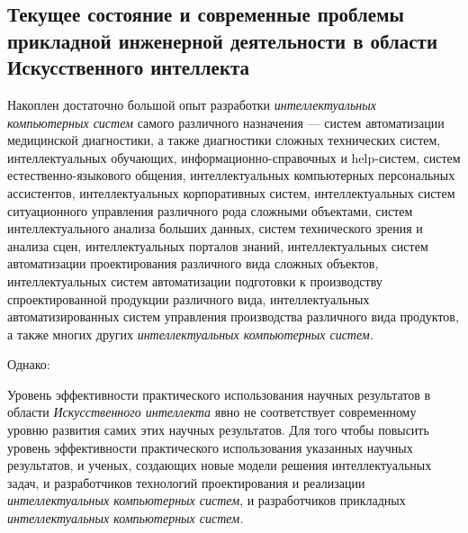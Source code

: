 \subsection{Текущее состояние и современные проблемы прикладной инженерной деятельности в области Искусственного интеллекта}
\label{subsec_current_state_and_modern_problems_applied_engineering_activity}

Накоплен достаточно большой опыт разработки \textit{интеллектуальных компьютерных систем} самого различного назначения --- систем автоматизации медицинской диагностики, а также диагностики сложных технических систем, интеллектуальных обучающих, информационно-справочных и help-систем, систем естественно-языкового общения, интеллектуальных компьютерных персональных ассистентов, интеллектуальных корпоративных систем, интеллектуальных систем ситуационного управления различного рода сложными объектами, систем интеллектуального анализа больших данных, систем технического зрения и анализа сцен, интеллектуальных порталов знаний, интеллектуальных систем автоматизации проектирования различного вида сложных объектов, интеллектуальных систем автоматизации подготовки к производству спроектированной продукции различного вида, интеллектуальных автоматизированных систем управления производства различного вида продуктов, а также многих других \textit{интеллектуальных компьютерных систем.}

Однако:

\begin{textitemize}
	\item
	Уровень эффективности практического использования научных результатов в области \textit{Искусственного интеллекта} явно не соответствует современному уровню развития самих этих научных результатов. Для того чтобы повысить уровень эффективности практического использования указанных научных результатов,   и ученых, создающих новые модели решения интеллектуальных задач, и разработчиков технологий проектирования и реализации \textit{интеллектуальных компьютерных систем}, и разработчиков прикладных \textit{интеллектуальных компьютерных систем.}
\end{textitemize}

